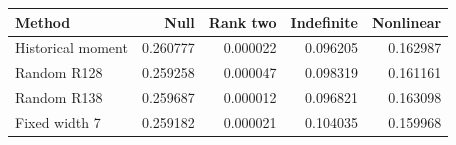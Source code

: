 \begin{tabular}{lrrrr}
\toprule
Method & Null & Rank two & Indefinite & Nonlinear \\
\midrule
Historical moment & 0.260777 & 0.000022 & 0.096205 & 0.162987 \\
Random R128 & 0.259258 & 0.000047 & 0.098319 & 0.161161 \\
Random R138 & 0.259687 & 0.000012 & 0.096821 & 0.163098 \\
Fixed width 7 & 0.259182 & 0.000021 & 0.104035 & 0.159968 \\
\bottomrule
\end{tabular}
